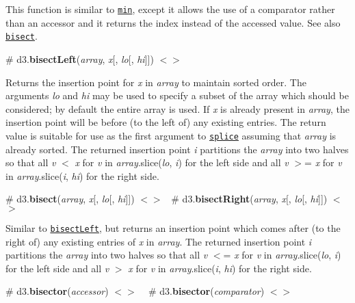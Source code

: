This function is similar to \href{#min}{\tt min}, except it allows the use of a comparator rather than an accessor and it returns the index instead of the accessed value. See also \href{#bisect}{\tt bisect}.

\label{_bisectLeft}%
\# d3.{\bfseries bisect\+Left}({\itshape array}, {\itshape x}\mbox{[}, {\itshape lo}\mbox{[}, {\itshape hi}\mbox{]}\mbox{]}) \href{https://github.com/d3/d3-array/blob/master/src/bisect.js#L6}{\tt $<$$>$}

Returns the insertion point for {\itshape x} in {\itshape array} to maintain sorted order. The arguments {\itshape lo} and {\itshape hi} may be used to specify a subset of the array which should be considered; by default the entire array is used. If {\itshape x} is already present in {\itshape array}, the insertion point will be before (to the left of) any existing entries. The return value is suitable for use as the first argument to \href{https://developer.mozilla.org/en/JavaScript/Reference/Global_Objects/Array/splice}{\tt splice} assuming that {\itshape array} is already sorted. The returned insertion point {\itshape i} partitions the {\itshape array} into two halves so that all {\itshape v} $<$ {\itshape x} for {\itshape v} in {\itshape array}.slice({\itshape lo}, {\itshape i}) for the left side and all {\itshape v} $>$= {\itshape x} for {\itshape v} in {\itshape array}.slice({\itshape i}, {\itshape hi}) for the right side.

\label{_bisect}%
\# d3.{\bfseries bisect}({\itshape array}, {\itshape x}\mbox{[}, {\itshape lo}\mbox{[}, {\itshape hi}\mbox{]}\mbox{]}) \href{https://github.com/d3/d3-array/blob/master/src/bisect.js}{\tt $<$$>$}~\newline
 \label{_bisectRight}%
\# d3.{\bfseries bisect\+Right}({\itshape array}, {\itshape x}\mbox{[}, {\itshape lo}\mbox{[}, {\itshape hi}\mbox{]}\mbox{]}) \href{https://github.com/d3/d3-array/blob/master/src/bisect.js#L6}{\tt $<$$>$}

Similar to \href{#bisectLeft}{\tt bisect\+Left}, but returns an insertion point which comes after (to the right of) any existing entries of {\itshape x} in {\itshape array}. The returned insertion point {\itshape i} partitions the {\itshape array} into two halves so that all {\itshape v} $<$= {\itshape x} for {\itshape v} in {\itshape array}.slice({\itshape lo}, {\itshape i}) for the left side and all {\itshape v} $>$ {\itshape x} for {\itshape v} in {\itshape array}.slice({\itshape i}, {\itshape hi}) for the right side.

\label{_bisector}%
\# d3.{\bfseries bisector}({\itshape accessor}) \href{https://github.com/d3/d3-array/blob/master/src/bisector.js}{\tt $<$$>$} ~\newline
\label{_bisector}%
\# d3.{\bfseries bisector}({\itshape comparator}) \href{https://github.com/d3/d3-array/blob/master/src/bisector.js}{\tt $<$$>$}

